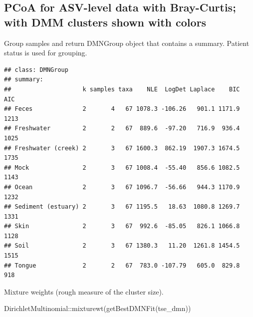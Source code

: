 \documentclass[
]{book}
\newenvironment{Shaded}{\begin{snugshade}}{\end{snugshade}}
\newcommand{\AttributeTok}[1]{\textcolor[rgb]{0.77,0.63,0.00}{#1}}
\newcommand{\DecValTok}[1]{\textcolor[rgb]{0.00,0.00,0.81}{#1}}
\newcommand{\FunctionTok}[1]{\textcolor[rgb]{0.00,0.00,0.00}{#1}}
\newcommand{\NormalTok}[1]{#1}
\newcommand{\OtherTok}[1]{\textcolor[rgb]{0.56,0.35,0.01}{#1}}
\newcommand{\SpecialCharTok}[1]{\textcolor[rgb]{0.00,0.00,0.00}{#1}}
\newcommand{\StringTok}[1]{\textcolor[rgb]{0.31,0.60,0.02}{#1}}
\begin{document}
\hypertarget{pcoa-for-asv-level-data-with-bray-curtis-with-dmm-clusters-shown-with-colors}{%
\subsection{PCoA for ASV-level data with Bray-Curtis; with DMM clusters shown with colors}\label{pcoa-for-asv-level-data-with-bray-curtis-with-dmm-clusters-shown-with-colors}}

Group samples and return DMNGroup object that contains a summary.
Patient status is used for grouping.

\begin{Shaded}
\end{Shaded}

\begin{verbatim}
## class: DMNGroup 
## summary:
##                    k samples taxa    NLE  LogDet Laplace    BIC  AIC
## Feces              2       4   67 1078.3 -106.26   901.1 1171.9 1213
## Freshwater         2       2   67  889.6  -97.20   716.9  936.4 1025
## Freshwater (creek) 2       3   67 1600.3  862.19  1907.3 1674.5 1735
## Mock               2       3   67 1008.4  -55.40   856.6 1082.5 1143
## Ocean              2       3   67 1096.7  -56.66   944.3 1170.9 1232
## Sediment (estuary) 2       3   67 1195.5   18.63  1080.8 1269.7 1331
## Skin               2       3   67  992.6  -85.05   826.1 1066.8 1128
## Soil               2       3   67 1380.3   11.20  1261.8 1454.5 1515
## Tongue             2       2   67  783.0 -107.79   605.0  829.8  918
\end{verbatim}

Mixture weights (rough measure of the cluster size).

\begin{Shaded}
\begin{Highlighting}[]
\NormalTok{DirichletMultinomial}\SpecialCharTok{::}\FunctionTok{mixturewt}\NormalTok{(}\FunctionTok{getBestDMNFit}\NormalTok{(tse\_dmn))}
\end{Highlighting}
\end{Shaded}
\end{document}
